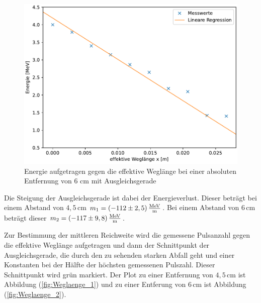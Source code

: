 \begin{figure}[H]
    \centering
    \includegraphics[width=\textwidth]{Plots/plot2.pdf}
    \caption{Energie aufgetragen gegen die effektive Weglänge bei einer absoluten Entfernung von 6 cm mit Ausgleichsgerade}
    \label{fig:Abstand_2}
\end{figure}

Die Steigung der Ausgleichsgerade ist dabei der Energieverlust. Dieser beträgt bei einem Abstand von $4,5 \, \unit{\centi\meter}$ $m_1 = (-112 \pm 2,5)\, 
\unit[per-mode=fraction]{\mega\eV\per\meter}$. Bei einem Abstand von $6 \, \unit{\centi\meter}$ beträgt dieser $m_2 = (-117 \pm 9,8)\, 
\unit[per-mode=fraction]{\mega\eV\per\meter}$. 

Zur Bestimmung der mittleren Reichweite wird die gemessene Pulsanzahl gegen die effektive Weglänge aufgetragen und dann der Schnittpunkt der Ausgleichsgerade, 
die durch den zu sehenden starken Abfall geht und einer Konstanten bei der Hälfte der höchsten gemessenen Pulszahl. Dieser Schnittpunkt wird grün markiert. 
Der Plot zu einer Entfernung von $4,5 \, \unit{\centi\meter}$ ist Abbildung (\ref{fig:Weglaenge_1}) und zu einer Entferung von $6 \, \unit{\centi\meter}$ 
ist Abbildung (\ref{fig:Weglaenge_2}). 

